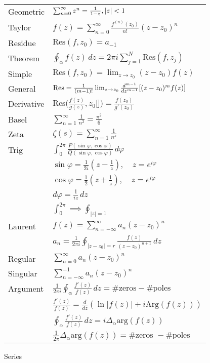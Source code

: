 \documentclass[10pt]{article}
\makeatletter
\newcommand{\abs}[1]{\left|#1\right|}
\let\originalleft\left
\let\originalright\right
\renewcommand{\left}{\mathopen{}\mathclose\bgroup\originalleft}
\renewcommand{\right}{\aftergroup\egroup\originalright}
\renewcommand{\section}{\@startsection{section}{1}{0ex}{-1ex}{0.7ex}
                        {\normalfont\large\bfseries}}
\renewcommand{\arg}{\text{arg}}
\newcommand{\Arg}{\text{Arg}}
\renewcommand{\phi}{\varphi}
\newcommand{\al}{\alpha}
\newcommand{\Res}{\text{Res}}
\makeatother
\begin{document}
\begin{multicols*}{3}
\begin{tabular}{@{}ll}
  Geometric & $\sum_{n=0}^\infty z^n=\frac{1}{1-z}, \abs{z}<1$ \\
  Taylor & $f(z)=\sum_{n=0}^\infty \frac{f^{(n)}(z_0)}{n!}(z-z_0)^n$ \\
  Residue & $\Res(f,z_0)=a_{-1}$ \\
  Theorem & $\oint_\al f(z)\,dz=2\pi i\sum_{j=1}^N \Res(f,z_j)$ \\
  Simple & $\Res(f,z_0)=\lim_{z\to z_0}(z-z_0)f(z)$ \\
  General & $\Res=\frac{1}{(m-1)!}\lim_{z\to z_0}\frac{d^{m-1}}{dz^{m-1}}\left[(z-z_0)^mf(z)\right]$ \\
  Derivative & $\Res\big(\frac{f(z)}{g(z)},z_0\big[\big])=\frac{f(z_0)}{g'(z_0)}$ \\
  Basel & $\sum_{n=1}^\infty \frac{1}{n^2}=\frac{\pi^2}{6}$ \\
  Zeta & $\zeta(s)=\sum_{n=1}^\infty \frac{1}{n^s}$ \\
  Trig & $\int_0^{2\pi}\frac{P(\sin\phi,\cos\phi)}{Q(\sin\phi,\cos\phi)}\,d\phi$ \\
  & $\sin\varphi=\frac{1}{2i}(z-\frac 1z),\quad z=e^{i\varphi}$ \\
  & $\cos\varphi=\frac 12(z+\frac 1z),\quad z=e^{i\varphi}$ \\
  & $d\varphi=\frac{1}{iz}\,dz$ \\
  & $\int_0^{2\pi}\implies \oint_{|z|=1}$ \\
  Laurent & $f(z)=\sum_{n=-\infty}^\infty a_n(z-z_0)^n$ \\
  & $a_n=\frac{1}{2\pi i}\oint_{|z-z_0|=r}\frac{f(z)}{(z-z_0)^{n+1}}\,dz$ \\
  Regular & $\sum_{n=0}^\infty a_n(z-z_0)^n$ \\
  Singular & $\sum_{n=-\infty}^{-1} a_n(z-z_0)^n$ \\
  Argument & $\frac{1}{2\pi i}\oint_\alpha \frac{f'(z)}{f(z)}\,dz=\#\text{zeros}-\#\text{poles}$ \\
  & $\frac{f'(z)}{f(z)}=\frac{d}{dz}(\ln|f(z)|+i\Arg(f(z)))$ \\
  & $\oint_\alpha\frac{f'(z)}{f(z)}\,dz = i\Delta_\al\arg(f(z))$ \\
  & $\frac{1}{2\pi} \Delta_{\alpha} \arg(f(z))=\#\text{zeros }-\#\text{poles}$
\end{tabular}

\section{Series}


\end{multicols*}
\end{document}
